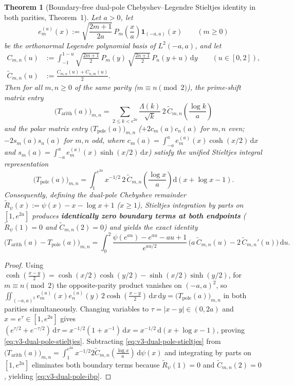 \documentclass[11pt]{article}
\newtheorem{theorem}{Theorem}[section]
\theoremstyle{remark}
\newcommand{\dd}{\mathrm d}
\begin{document}
\begin{theorem}[Boundary-free dual-pole Chebyshev--Legendre Stieltjes identity in both parities,  Theorem~1]\label{thm:v3-dual-pole-stieltjes}
Let $a>0$, let
\[
 e_m^{(a)}(x) := \sqrt{\frac{2m+1}{2a}}\,P_m\!\left(\frac{x}{a}\right)\mathbf{1}_{(-a,a)}(x)\qquad (m\ge 0)
\]
be the orthonormal Legendre polynomial basis of $L^2(-a,a)$, and let
\begin{align*}
 C_{m,n}(u) &:= \int_{-1}^{1-u}\sqrt{\frac{2m+1}{2}}\,P_m(y)\,\sqrt{\frac{2n+1}{2}}\,P_n(y+u)\,\dd y\qquad (u\in[0,2]),\\
 \widetilde C_{m,n}(u) &:= \frac{C_{m,n}(u)+C_{n,m}(u)}{2}.
\end{align*}
Then for all $m,n\ge 0$ of the same parity ($m\equiv n\pmod 2$), the prime-shift matrix entry
\[
 \bigl(T_{\mathrm{arith}}(a)\bigr)_{m,n} = \sum_{2\le k<e^{2a}}\frac{\Lambda(k)}{\sqrt k}\,2\,\widetilde C_{m,n}\!\left(\frac{\log k}{a}\right)
\]
and the polar matrix entry $\bigl(T_{\mathrm{pole}}(a)\bigr)_{m,n}$ ($+2c_m(a)c_n(a)$ for $m,n$ even; $-2s_m(a)s_n(a)$ for $m,n$ odd, where $c_m(a)=\int_{-a}^a e_m^{(a)}(x)\cosh(x/2)\,\dd x$ and $s_m(a)=\int_{-a}^a e_m^{(a)}(x)\sinh(x/2)\,\dd x$) satisfy the unified Stieltjes integral representation
\begin{equation}\label{eq:v3-dual-pole-stieltjes}
 \bigl(T_{\mathrm{pole}}(a)\bigr)_{m,n} = \int_1^{e^{2a}} x^{-1/2}\,2\,\widetilde C_{m,n}\!\left(\frac{\log x}{a}\right)\dd(x+\log x-1).
\end{equation}
Consequently, defining the dual-pole Chebyshev remainder $\widetilde R_\psi(x):=\psi(x)-x-\log x+1$ ($x\ge 1$), Stieltjes integration by parts on $[1,e^{2a}]$ produces \textbf{identically zero boundary terms at both endpoints} ($\widetilde R_\psi(1)=0$ and $\widetilde C_{m,n}(2)=0$) and yields the exact identity
\begin{equation}\label{eq:v3-dual-pole-ibp}
 \bigl(T_{\mathrm{arith}}(a)-T_{\mathrm{pole}}(a)\bigr)_{m,n} = \int_0^2 \frac{\psi(e^{au})-e^{au}-au+1}{e^{au/2}}\,\bigl(a\,\widetilde C_{m,n}(u)-2\,\widetilde C_{m,n}'(u)\bigr)\,\dd u.
\end{equation}
\end{theorem}
\begin{proof}
Using $\cosh(\frac{x-y}{2})=\cosh(x/2)\cosh(y/2)-\sinh(x/2)\sinh(y/2)$, for $m\equiv n\pmod 2$ the opposite-parity product vanishes on $(-a,a)^2$, so $\iint_{(-a,a)^2} e_m^{(a)}(x)e_n^{(a)}(y)\,2\cosh(\frac{x-y}{2})\,\dd x\,\dd y = \bigl(T_{\mathrm{pole}}(a)\bigr)_{m,n}$ in both parities simultaneously. Changing variables to $\tau=|x-y|\in(0,2a)$ and $x=e^\tau\in[1,e^{2a}]$ gives $(e^{\tau/2}+e^{-\tau/2})\,\dd\tau = x^{-1/2}(1+x^{-1})\,\dd x = x^{-1/2}\,\dd(x+\log x-1)$, proving \eqref{eq:v3-dual-pole-stieltjes}. Subtracting \eqref{eq:v3-dual-pole-stieltjes} from $\bigl(T_{\mathrm{arith}}(a)\bigr)_{m,n}=\int_1^{e^{2a}}x^{-1/2}2\widetilde C_{m,n}(\frac{\log x}{a})\,\dd\psi(x)$ and integrating by parts on $[1,e^{2a}]$ eliminates both boundary terms because $\widetilde R_\psi(1)=0$ and $\widetilde C_{m,n}(2)=0$, yielding \eqref{eq:v3-dual-pole-ibp}.
\end{proof}
\end{document}
